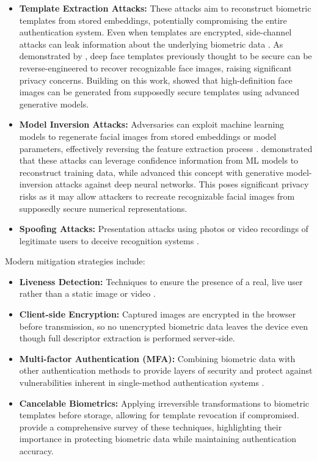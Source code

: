 \begin{itemize}
\item \textbf{Template Extraction Attacks:} These attacks aim to reconstruct biometric templates from stored embeddings, potentially compromising the entire authentication system. Even when templates are encrypted, side-channel attacks can leak information about the underlying biometric data \autocite{Mai2019, Dong2021}. As demonstrated by \textcite{Mai2019}, deep face templates previously thought to be secure can be reverse-engineered to recover recognizable face images, raising significant privacy concerns. Building on this work, \textcite{Dong2021} showed that high-definition face images can be generated from supposedly secure templates using advanced generative models.

\item \textbf{Model Inversion Attacks:} Adversaries can exploit machine learning models to regenerate facial images from stored embeddings or model parameters, effectively reversing the feature extraction process \autocite{Fredrikson2015, Zhang2020}. \textcite{Fredrikson2015} demonstrated that these attacks can leverage confidence information from ML models to reconstruct training data, while \textcite{Zhang2020} advanced this concept with generative model-inversion attacks against deep neural networks. This poses significant privacy risks as it may allow attackers to recreate recognizable facial images from supposedly secure numerical representations.

\item \textbf{Spoofing Attacks:} Presentation attacks using photos or video recordings of legitimate users to deceive recognition systems \autocite{Kuznetsov2024}.
\end{itemize}

Modern mitigation strategies include:
\begin{itemize}
\item \textbf{Liveness Detection:} Techniques to ensure the presence of a real, live user rather than a static image or video \autocite{Kuznetsov2024}.

\item \textbf{Client-side Encryption:} Captured images are encrypted in the browser before transmission, so no unencrypted biometric data leaves the device even though full descriptor extraction is performed server-side.

\item \textbf{Multi-factor Authentication (MFA):} Combining biometric data with other authentication methods to provide layers of security and protect against vulnerabilities inherent in single-method authentication systems \autocite{Furnell2022}.

\item \textbf{Cancelable Biometrics:} Applying irreversible transformations to biometric templates before storage, allowing for template revocation if compromised. \textcite{Rathgeb2011} provide a comprehensive survey of these techniques, highlighting their importance in protecting biometric data while maintaining authentication accuracy.
\end{itemize}


